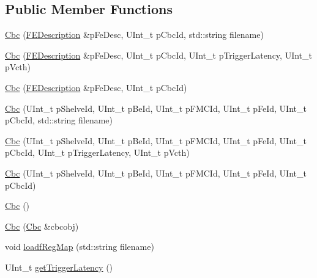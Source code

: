 \subsection*{Public Member Functions}
\begin{DoxyCompactItemize}
\item 
\hyperlink{class_ph2___hw_description_1_1_cbc_a29a920416ec25eb6a5a4da96c955c6f2}{Cbc} (\hyperlink{class_ph2___hw_description_1_1_f_e_description}{F\-E\-Description} \&p\-Fe\-Desc, U\-Int\-\_\-t p\-Cbc\-Id, std\-::string filename)
\item 
\hyperlink{class_ph2___hw_description_1_1_cbc_a6d0430dc3ecc6d50d903326851ec187b}{Cbc} (\hyperlink{class_ph2___hw_description_1_1_f_e_description}{F\-E\-Description} \&p\-Fe\-Desc, U\-Int\-\_\-t p\-Cbc\-Id, U\-Int\-\_\-t p\-Trigger\-Latency, U\-Int\-\_\-t p\-Vcth)
\item 
\hyperlink{class_ph2___hw_description_1_1_cbc_a12a0cfdb2423efbdfe3cbb77605edb27}{Cbc} (\hyperlink{class_ph2___hw_description_1_1_f_e_description}{F\-E\-Description} \&p\-Fe\-Desc, U\-Int\-\_\-t p\-Cbc\-Id)
\item 
\hyperlink{class_ph2___hw_description_1_1_cbc_a6f8623f5069384c4fc38613a9282c8ce}{Cbc} (U\-Int\-\_\-t p\-Shelve\-Id, U\-Int\-\_\-t p\-Be\-Id, U\-Int\-\_\-t p\-F\-M\-C\-Id, U\-Int\-\_\-t p\-Fe\-Id, U\-Int\-\_\-t p\-Cbc\-Id, std\-::string filename)
\item 
\hyperlink{class_ph2___hw_description_1_1_cbc_a3b7de3360f9a6d2c51a8157c33b35a9f}{Cbc} (U\-Int\-\_\-t p\-Shelve\-Id, U\-Int\-\_\-t p\-Be\-Id, U\-Int\-\_\-t p\-F\-M\-C\-Id, U\-Int\-\_\-t p\-Fe\-Id, U\-Int\-\_\-t p\-Cbc\-Id, U\-Int\-\_\-t p\-Trigger\-Latency, U\-Int\-\_\-t p\-Vcth)
\item 
\hyperlink{class_ph2___hw_description_1_1_cbc_a1ece58ac5eeb8be356db219362ab94ca}{Cbc} (U\-Int\-\_\-t p\-Shelve\-Id, U\-Int\-\_\-t p\-Be\-Id, U\-Int\-\_\-t p\-F\-M\-C\-Id, U\-Int\-\_\-t p\-Fe\-Id, U\-Int\-\_\-t p\-Cbc\-Id)
\item 
\hyperlink{class_ph2___hw_description_1_1_cbc_a5b7124456823871d611ada17ed0a51a1}{Cbc} ()
\item 
\hyperlink{class_ph2___hw_description_1_1_cbc_a60f38c0d244e039c6c257b9e6e750d71}{Cbc} (\hyperlink{class_ph2___hw_description_1_1_cbc}{Cbc} \&cbcobj)
\item 
void \hyperlink{class_ph2___hw_description_1_1_cbc_afd6fdbe40eff3c160221a3a8acfb657d}{loadf\-Reg\-Map} (std\-::string filename)
\item 
U\-Int\-\_\-t \hyperlink{class_ph2___hw_description_1_1_cbc_addf431ddc5a2297f7282ab23b1e3cdce}{get\-Trigger\-Latency} ()

\end{DoxyCompactItemize}
